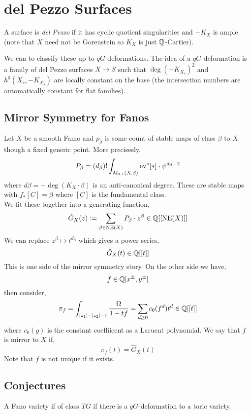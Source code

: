 \documentclass[12pt]{article}
\begin{document}
\section{del Pezzo Surfaces}

\begin{defn}
A surface is \textit{del Pezzo} if it has cyclic quotient singularities and $-K_X$ is ample (note that $X$ need not be Gorenstein so $K_X$ is just $\mathbb{Q}$-Cartier).  
\end{defn}

\begin{rmk}
We can to classify these up to $qG$-deformations. The idea of a $qG$-deformation is a family of del Pezzo surfaces $X \to S$ such that $\deg(-K_{X_s})^2$ and $h^0(X_s, -K_{X_s})$ are locally constant on the base (the intersection numbers are automatically constant for flat families). 
\end{rmk}

\subsection{Mirror Symmetry for Fanos}

Let $X$ be a smooth Famo and $p_\beta$ is some count of stable maps of class $\beta$ to $X$ though a fixed generic point. More precisesly,
\[ P_\beta = (d_\beta)! \int_{M_{0,1}(X, \beta)} \mathrm{ev}^* [*] \cdot \psi^{d_{\beta} - 2} \]
where $d \beta = - \deg{(K_X \cdot \beta)}$ is an anti-canonical degree. These are stable maps with $f_* [C] = \beta$ where $[C]$ is the fundamental class. 
\bigskip\\
We fit these together into a generating function,
\[ \hat{G}_X(z) := \sum_{\beta \in \mathrm{NE}(X)} P_{\beta} \cdot z^\beta \in \mathbb{Q}[[\mathrm{NE}(X)]] \]
We can replace $z^\beta \mapsto t^{d_{\beta}}$ which gives a power series,
\[ \hat{G}_X(t) \in \mathbb{Q}[[t]] \]
This is one side of the mirror symmetry story. On the other side we have,
\[ f \in \mathbb{Q}[x^{\pm}, y^{\pm}] \]
then consider,
\[ \pi_f = \int_{|z_1| = |z_2| = 1} \frac{\Omega}{1 - t f} = \sum_{d \ge 0} c_0(f^d) t^d \in \mathbb{Q}[[t]] \]
where $c_0(g)$ is the constant coeffiicent as a Laruent polynomial. We say that $f$ is mirror to $X$ if,
\[ \pi_f(t) = \hat{G}_X(t) \]
Note that $f$ is not unique if it exists. 

\subsection{Conjectures}

\begin{defn}
A Fano variety if of class $TG$ if there is a $qG$-deformation to a toric variety.
\end{defn}
\end{document}
